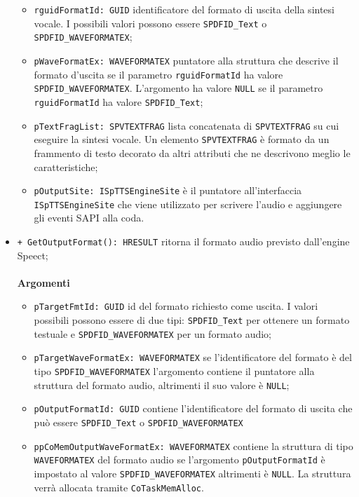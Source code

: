 \begin{itemize}
\begin{itemize}
		\item \texttt{rguidFormatId: GUID} identificatore del formato di uscita della sintesi vocale. I possibili valori possono essere \texttt{SPDFID\_Text} o\\\texttt{SPDFID\_WAVEFORMATEX};
		\item \texttt{pWaveFormatEx: WAVEFORMATEX} puntatore alla struttura che descrive il formato d'uscita se il parametro \texttt{rguidFormatId} ha valore\\\texttt{SPDFID\_WAVEFORMATEX}. L'argomento ha valore \texttt{NULL} se il parametro \texttt{rguidFormatId} ha valore \texttt{SPDFID\_Text};
		\item \texttt{pTextFragList: SPVTEXTFRAG} lista concatenata di \texttt{SPVTEXTFRAG} su cui eseguire la sintesi vocale. Un elemento \texttt{SPVTEXTFRAG} è formato da un frammento di testo decorato da altri attributi che ne descrivono meglio le caratteristiche;
		\item \texttt{pOutputSite: ISpTTSEngineSite} è il puntatore all'interfaccia\\\texttt{ISpTTSEngineSite} che viene utilizzato per scrivere l'audio e aggiungere gli eventi SAPI alla coda.
	\end{itemize}
	\item \texttt{+ GetOutputFormat(): HRESULT} ritorna il formato audio previsto dall'engine Speect;
	\\\\
	\textbf{Argomenti}
	\begin{itemize}
		\item \texttt{pTargetFmtId: GUID} id del formato richiesto come uscita. I valori possibili possono essere di due tipi: \texttt{SPDFID\_Text} per ottenere un formato testuale e \texttt{SPDFID\_WAVEFORMATEX} per un formato audio;
		\item \texttt{pTargetWaveFormatEx: WAVEFORMATEX} se l'identificatore del formato è del tipo \texttt{SPDFID\_WAVEFORMATEX} l'argomento contiene il puntatore alla struttura del formato audio, altrimenti il suo valore è \texttt{NULL};
		\item \texttt{pOutputFormatId: GUID} contiene l'identificatore del formato di uscita che può essere \texttt{SPDFID\_Text} o \texttt{SPDFID\_WAVEFORMATEX}
		\item \texttt{ppCoMemOutputWaveFormatEx: WAVEFORMATEX} contiene la struttura di tipo \texttt{WAVEFORMATEX} del formato audio se l'argomento \texttt{pOutputFormatId} è impostato al valore \texttt{SPDFID\_WAVEFORMATEX} altrimenti è \texttt{NULL}. La struttura verrà allocata tramite \texttt{CoTaskMemAlloc}.

\end{itemize}
\end{itemize}
